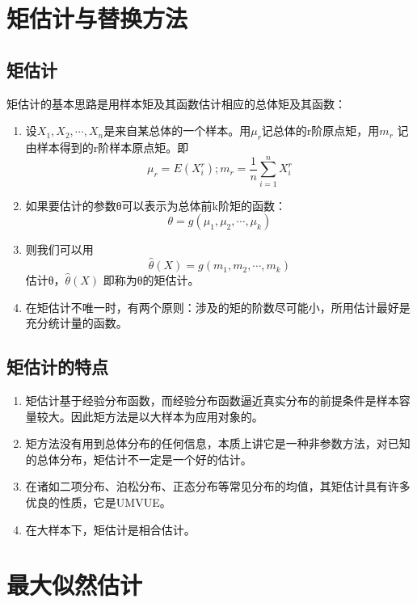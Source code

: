 \documentclass[
]{book}
\begin{document}
\section{矩估计与替换方法}\label{ux77e9ux4f30ux8ba1ux4e0eux66ffux6362ux65b9ux6cd5}

\subsection{矩估计}\label{ux77e9ux4f30ux8ba1}

矩估计的基本思路是用样本矩及其函数估计相应的总体矩及其函数：

\begin{enumerate}
\def\labelenumi{\arabic{enumi}.}
\item
  设\(X_1,X_2,\cdots,X_n\)是来自某总体的一个样本。用\(\mu_r\)记总体的r阶原点矩，用\(m_r\) 记由样本得到的r阶样本原点矩。即
  \[
  \mu_r=E(X_i^r);m_r=\frac{1}{n}\sum_{i=1}^nX_i^r
  \]
\item
  如果要估计的参数θ可以表示为总体前k阶矩的函数：
  \[
  \theta=g(\mu_1,\mu_2,\cdots,\mu_k)
  \]
\item
  则我们可以用
  \[
  \hat{\theta}(X)=g(m_1,m_2,\cdots,m_k)
  \]
  估计θ，\(\hat{\theta}(X)\) 即称为θ的矩估计。
\item
  在矩估计不唯一时，有两个原则：涉及的矩的阶数尽可能小，所用估计最好是充分统计量的函数。
\end{enumerate}

\subsection{矩估计的特点}\label{ux77e9ux4f30ux8ba1ux7684ux7279ux70b9}

\begin{enumerate}
\def\labelenumi{\arabic{enumi}.}
\item
  矩估计基于经验分布函数，而经验分布函数逼近真实分布的前提条件是样本容量较大。因此矩方法是以大样本为应用对象的。
\item
  矩方法没有用到总体分布的任何信息，本质上讲它是一种非参数方法，对已知的总体分布，矩估计不一定是一个好的估计。
\item
  在诸如二项分布、泊松分布、正态分布等常见分布的均值，其矩估计具有许多优良的性质，它是UMVUE。
\item
  在大样本下，矩估计是相合估计。
\end{enumerate}

\section{最大似然估计}\label{ux6700ux5927ux4f3cux7136ux4f30ux8ba1}
\end{document}
